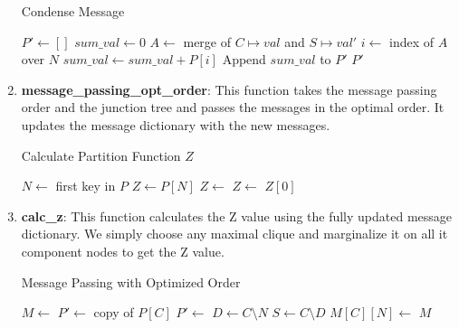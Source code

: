 \documentclass[12pt]{article}
\begin{document}
\begin{enumerate}
    \begin{algorithm}
        \caption{Condense Message}
        \begin{algorithmic}[1]
            \State $P' \gets []$
                \State $sum\_val \gets 0$
                    \State $A \gets$ merge of $C \mapsto val$ and $S \mapsto val'$
                    \State $i \gets$ index of $A$ over $N$
                    \State $sum\_val \gets sum\_val + P[i]$
                \EndFor
                \State Append $sum\_val$ to $P'$
            \EndFor
            \State \Return $P'$
        \EndFunction
        \end{algorithmic}
    \end{algorithm}
        
    \item \textbf{message\_passing\_opt\_order}: This function takes the message passing order and the junction tree and passes the messages in the optimal order. It updates the message dictionary with the new messages.
    
    \begin{algorithm}
        \caption{Calculate Partition Function $Z$}
        \begin{algorithmic}[1]
            \State $N \gets$ first key in $P$
            \State $Z \gets P[N]$
                \State $Z \gets$ 
            \EndFor
            \State $Z \gets$ 
            \State \Return $Z[0]$
        \EndFunction
        \end{algorithmic}
    \end{algorithm}
        
    \item \textbf{calc\_z}: This function calculates the Z value using the fully updated message dictionary. We simply choose any maximal clique and marginalize it on all it component nodes to get the Z value.
    
    \begin{algorithm}
        \caption{Message Passing with Optimized Order}
        \begin{algorithmic}[1]
            \State $M \gets$ 
                \State $P' \gets$ copy of $P[C]$
                    \State $P' \gets$ 
                \EndFor
                \State $D \gets C \setminus N$
                \State $S \gets C \setminus D$
                \State $M[C][N] \gets$ 
            \EndFor
            \State \Return $M$
        \EndFunction
        \end{algorithmic}
    \end{algorithm}
        
\end{enumerate}
\end{document}
